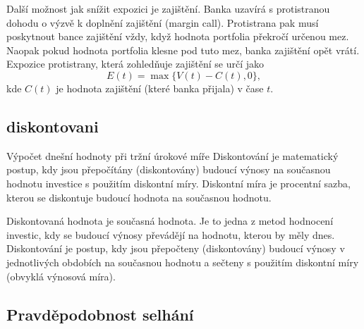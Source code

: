 \documentclass[a4paper,12pt]{report}
\theoremstyle{definition} \newtheorem{definice}[veta]{Definice}
\theoremstyle{remark}
\begin{document}
Další možnost jak snížit expozici je zajištění.
Banka uzavírá s protistranou dohodu o výzvě k doplnění zajištění (margin call).
Protistrana pak musí poskytnout bance zajištění vždy, když hodnota portfolia překročí určenou mez.
Naopak pokud hodnota portfolia klesne pod tuto mez, banka zajištění opět vrátí.
Expozice protistrany, která zohledňuje zajištění se určí jako
\begin{equation}
E(t)=\max\{V(t)-C(t),0\},
\end{equation}
kde $C(t)$ je hodnota zajištění (které banka přijala) v čase $t$.  

\subsection{diskontovani}
Výpočet dnešní hodnoty při tržní úrokové míře
Diskontování je matematický postup, kdy jsou přepočítány (diskontovány) budoucí výnosy na současnou hodnotu investice s použitím diskontní míry.
Diskontní míra je procentní sazba, kterou se diskontuje budoucí hodnota na současnou hodnotu.

Diskontovaná hodnota je současná hodnota. Je to jedna z metod hodnocení investic, kdy se budoucí výnosy převádějí na hodnotu, kterou by měly dnes.
Diskontování je postup, kdy jsou přepočteny (diskontovány) budoucí výnosy v jednotlivých obdobích na současnou hodnotu a sečteny s použitím diskontní míry (obvyklá výnosová míra).

\subsection{Pravděpodobnost selhání}
\end{document}
